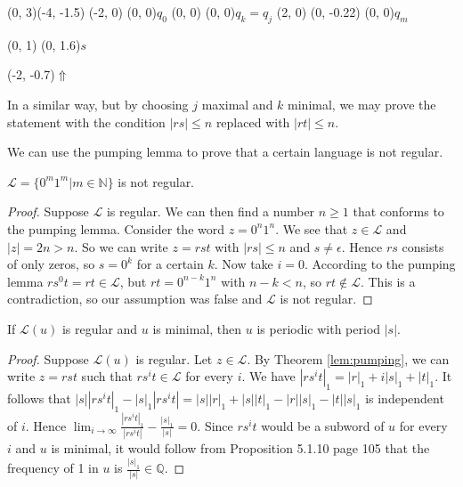 \documentclass{article}
\begin{document}
\begin{graph}(0, 3)(-4, -1.5)
  (-2, 0) (0, 0){\bs$q_0$\es}
  (0, 0) (0, 0){\bS$q_k=q_j$\eS}
  (2, 0)
    (0, -0.22){} (0, 0){\bs$q_m$\es}

   
  (0, 1) \freetext(0, 1.6){$s$}
   

  \freetext(-2, -0.7){$\Uparrow$}
\end{graph}

\begin{remark}
In a similar way, but by choosing $j$ maximal and $k$ minimal, we may prove 
the statement with the condition $|rs| \le n$ replaced with $|rt| \le n$.
\end{remark}

We can use the pumping lemma to prove that a certain language is not regular.

\begin{example} \label{ex:pumping}
$\mathcal{L} = \{0^m1^m | m \in \mathbb{N}\}$ is not regular.
\end{example}

\begin{proof}
Suppose $\mathcal{L}$ is regular. We can then find a number $n \ge 1$ that
conforms to the pumping lemma. Consider the word $z = 0^n 1^n$. We see that 
$z \in \mathcal{L}$ and $|z| = 2n > n$. So we can write $z = r s t$ with 
$|r s| \le n$ and $s \ne \epsilon$. Hence $rs$ consists of only zeros, so 
$s = 0^k$ for a certain $k$. Now take $i = 0$. According to the pumping lemma
$r s^0 t = r t \in \mathcal{L}$, but $r t = 0^{n - k} 1^n$ with $n - k < n$, so
$rt \notin \mathcal{L}$. This is a contradiction, so our assumption was false
and $\mathcal{L}$ is not regular. 
\end{proof}

\begin{theorem} \label{thm:not_regular}
If $\mathcal{L}(u)$ is regular and $u$ is minimal, then $u$ is periodic with
period $|s|$.
\end{theorem}

\begin{proof}
Suppose $\mathcal{L}(u)$ is regular. Let $z \in \mathcal{L}$. By Theorem 
\ref{lem:pumping}, we can write $z = r s t$ such that $r s^i t \in \mathcal{L}$ 
for every $i$. We have $|r s^i t|_1 = |r|_1 + i|s|_1 + |t|_1$. It follows that
$|s| |r s^i t|_1 - |s|_1 |r s^i t| = |s| |r|_1 + |s| |t|_1 - |r| |s|_1 - 
|t| |s|_1$ is independent of $i$. Hence $\lim_{i \to \infty} 
\frac{|r s^i t|_1}{|r s^i t|} - \frac{|s|_1}{|s|} = 0$. Since $r s^i t$ would
be a subword of $u$ for every $i$ and $u$ is minimal, it would follow from
Proposition 5.1.10 \cite{Fogg} page 105 that the frequency of 1 in $u$ is 
$\frac{|s|_1}{|s|} \in \mathbb{Q}$. 
\end{proof}
\end{document}
